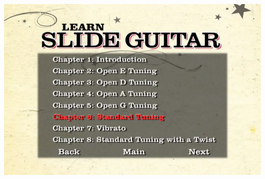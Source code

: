 \documentclass[a4paper]{book}
\begin{document}
\begin{center}
\includegraphics[width=17cm,height=11.333cm]{lebluessupportsmethodes-img128.jpg}
\end{center}
\end{document}
